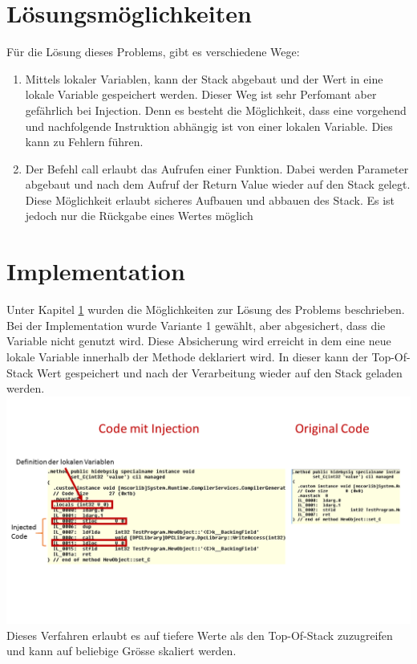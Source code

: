 \documentclass[10pt,a4paper]{article}
\begin{document}
\section{Lösungsmöglichkeiten}\label{sec:Lösungsmöglichkeiten}
\begin{flushleft}
Für die Lösung dieses Problems, gibt es verschiedene Wege:
\begin{enumerate}
\item Mittels lokaler Variablen, kann der Stack abgebaut und der Wert in eine lokale Variable gespeichert werden. Dieser Weg ist sehr Perfomant aber gefährlich bei Injection. Denn es besteht die Möglichkeit, dass eine vorgehend und nachfolgende Instruktion abhängig ist von einer lokalen Variable. Dies kann zu Fehlern führen.
\item Der Befehl call erlaubt das Aufrufen einer Funktion. Dabei werden Parameter abgebaut und nach dem Aufruf der Return Value wieder auf den Stack gelegt. Diese Möglichkeit erlaubt sicheres Aufbauen und abbauen des Stack. Es ist jedoch nur die Rückgabe eines Wertes möglich
\end{enumerate}
\end{flushleft}
\newpage
\section{Implementation}
\begin{flushleft}
Unter Kapitel \ref{sec:Lösungsmöglichkeiten} wurden die Möglichkeiten zur Lösung des Problems beschrieben. Bei der Implementation wurde Variante 1 gewählt, aber abgesichert, dass die Variable nicht genutzt wird. Diese Absicherung wird erreicht in dem eine neue lokale Variable innerhalb der Methode deklariert wird. In dieser kann der Top-Of-Stack Wert gespeichert und nach der Verarbeitung wieder auf den Stack geladen werden.
\includegraphics[width=16cm, clip]{pictures/Stackinjection.png}
Dieses Verfahren erlaubt es auf tiefere Werte als den Top-Of-Stack zuzugreifen und kann auf beliebige Grösse skaliert werden.
\end{flushleft}
\end{document}
